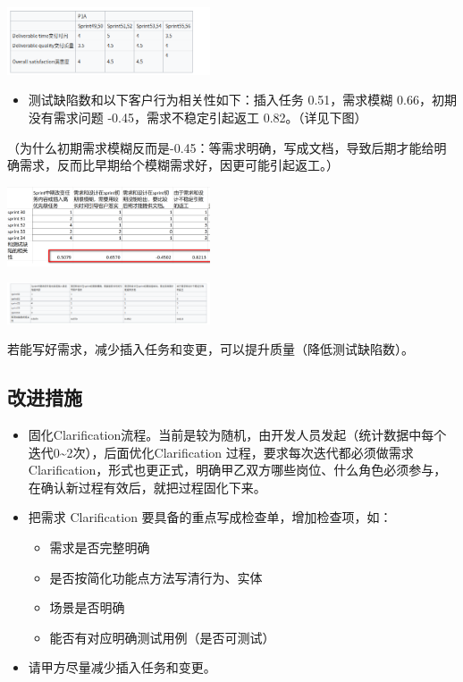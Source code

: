 \includegraphics[width=6cm]{Screenshotfrom2023-10-1223-17-39.png}

\begin{itemize}
\tightlist
\item
  测试缺陷数和以下客户行为相关性如下：插入任务 0.51，需求模糊
  0.66，初期没有需求问题 -0.45，需求不稳定引起返工 0.82。（详见下图）
\end{itemize}

（为什么初期需求模糊反而是-0.45：等需求明确，写成文档，导致后期才能给明确需求，反而比早期给个模糊需求好，因更可能引起返工。）


\includegraphics[width=6cm]{微信截图_20230625135338.png}

\includegraphics[width=6cm]{Screenshotfrom2023-10-1223-18-56.png}

若能写好需求，减少插入任务和变更，可以提升质量（降低测试缺陷数）。

\hypertarget{ux6539ux8fdbux63aaux65bd}{%
\subsection{改进措施}\label{ux6539ux8fdbux63aaux65bd}}

\begin{itemize}
\tightlist
\item
  固化Clarification流程。当前是较为随机，由开发人员发起（统计数据中每个迭代0\textasciitilde{}2次），后面优化Clarification
  过程，要求每次迭代都必须做需求Clarification，形式也更正式，明确甲乙双方哪些岗位、什么角色必须参与，在确认新过程有效后，就把过程固化下来。
\item
  把需求 Clarification 要具备的重点写成检查单，增加检查项，如：

  \begin{itemize}
  \tightlist
  \item
    需求是否完整明确
  \item
    是否按简化功能点方法写清行为、实体
  \item
    场景是否明确
  \item
    能否有对应明确测试用例（是否可测试）
  \end{itemize}
\item
  请甲方尽量减少插入任务和变更。
\end{itemize}

